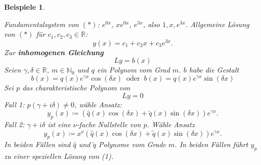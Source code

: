 \documentclass[12pt]{extreport} %
\newcommand{\N}{\mathbb{N}}
\newcommand{\R}{\mathbb{R}}
\theoremstyle{named}
\theoremstyle{nnamed}
\theoremstyle{itshape}
\theoremstyle{normal}
\newtheorem*{beispiele}{Beispiele}
\begin{document}
\begin{beispiele}
\begin{enumerate}
			\bigskip
			
			Fundamentalsystem von $(*)$: $e^{0x}$, $x e^{0x}$, $e^{3x}$, also $1, x, e^{3x}$. Allgemeine Lösung von $(*)$ für $c_{1}, c_{2}, c_{3} \in \R$:
			$$	y(x) = c_{1} + c_{2} x + c_{3} e^{3x}.  $$
			Zur \textbf{inhomogenen Gleichung}
			\begin{equation*}
				L y = b(x) \tag*{(1)}
			\end{equation*}
			Seien $\gamma, \delta \in \R$, $m \in \N_{0}$ und $q$ ein Polynom vom Grad $m$. $b$ habe die Gestalt
			$$ b(x) = q(x) e^{\gamma x } \cos \left( \delta x \right) ~ \text{ oder } ~ b(x) = q(x) e^{\gamma x} \sin \left( \delta x \right) $$
			Sei $p$ das charakteristische Polynom von 
			\begin{equation*}
				Ly = 0 \tag*{(2)}
			\end{equation*}
			Fall 1: $p \left( \gamma + i \delta\right) \neq 0$, wähle Ansatz:
			$$ y_{p}(x) \coloneqq \left( \hat{q}(x) \cos\left( \delta x \right) + \tilde{q}(x) \sin \left( \delta x \right) \right) e^{\gamma x}. $$
			Fall 2: $\gamma + i \delta$ ist eine $\nu$-fache Nullstelle von $p$. Wähle Ansatz
			$$ y_{p}(x) \coloneqq x^{\nu} \left( \hat{q}(x) \cos\left( \delta x \right) + \tilde{q}(x) \sin \left( \delta x \right) \right) e^{\gamma x}. $$
			In beiden Fällen sind $\hat{q}$ und $\tilde{q}$ Polynome vom Grade $m$. In beiden Fällen führt $y_{p}$ zu einer speziellen Lösung von (1).
	\end{enumerate}
\end{beispiele}
\end{document}
